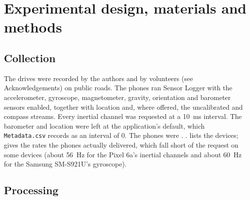 \section{Experimental design, materials and methods}
\label{sec:methods}

\subsection{Collection}
\label{sec:collection}

The drives were recorded by the authors and by volunteers (see Acknowledgements) on public roads. The phones ran Sensor Logger \citep{sensorlogger} with the accelerometer, gyroscope, magnetometer, gravity, orientation and barometer sensors enabled, together with location and, where offered, the uncalibrated and compass streams. Every inertial channel was requested at a 10~ms interval. The barometer and location were left at the application's default, which \texttt{Metadata.csv} records as an interval of 0. The phones were . .  lists the devices;  gives the rates the phones actually delivered, which fall short of the request on some devices (about 56~Hz for the Pixel 6a's inertial channels and about 60~Hz for the Samsung SM-S921U's gyroscope).

\subsection{Processing}
\label{sec:processing}

